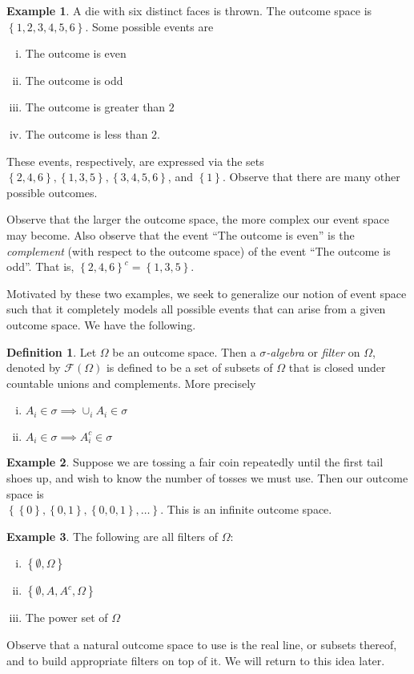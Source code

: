 \documentclass[12pt]{amsbook}
\newcommand{\filter}{\mathcal{F}}
\theoremstyle{plain}
\theoremstyle{definition}
\newtheorem*{definition}{Definition}
\newtheorem*{example}{Example}
\theoremstyle{remark}
\numberwithin{equation}{section}  %
\begin{document}
\begin{example}
	A die with six distinct faces is thrown. The outcome space is
	$ \left\{ 1, 2, 3, 4, 5, 6 \right\} $. Some possible events are
	\begin{enumerate}[(i)]
		\item The outcome is even
		\item The outcome is odd
		\item The outcome is greater than $2$
		\item The outcome is less than $2$.
	\end{enumerate}
	These events, respectively, are expressed via the sets
	$ \left\{ 2, 4, 6 \right\} , \left\{ 1,3,5 \right\} , \left\{ 3, 4, 5, 6
	\right\}$, and $\left\{ 1 \right\}$.
	Observe that there are many other possible outcomes.
\end{example}
Observe that the larger the outcome space, the more complex
our event space may become. Also observe that the event
``The outcome is even'' is the \emph{complement} (with respect to the
outcome space) of
the event ``The outcome is odd''. That is,
${\left\{ 2,4,6 \right\}}^c
= \left\{ 1,3,5 \right\}$.

Motivated by these two examples, we seek to generalize our notion of
event space such that it completely models all possible events
that can arise from a given outcome space. We have the following.
\begin{definition}
	Let $\Omega$ be an outcome space. Then a \emph{$\sigma$-algebra}
	or \emph{filter} on $\Omega$, denoted by $\filter(\Omega)$ is defined to be 
	a
	set of subsets of $\Omega$ that is closed under countable
	unions and complements.
	More precisely
	\begin{enumerate}[(i)]
		\item $ A_i \in  \sigma \implies \cup_i A_i \in \sigma$
		\item $A_i \in \sigma \implies A_i^c \in \sigma$
	\end{enumerate}
\end{definition}
\begin{example}
	Suppose we are tossing a fair coin repeatedly until the first tail shoes up,
	and wish to know the number of tosses we must use. Then our outcome space
	is \\ $ \left\{ \left\{ 0 \right\} , \left\{ 0,1 \right\} , \left\{ 0,0,1
	\right\},\ldots \right\}$. This is an infinite outcome space.
\end{example}
\begin{example} The following are all filters of $\Omega$:
	\begin{enumerate}[(i)]
		\item $\left\{ \emptyset, \Omega \right\}$
		\item $\left\{ \emptyset, A, A^c, \Omega \right\}$
		\item The power set of $\Omega$
	\end{enumerate}
\end{example}
Observe that a natural outcome space to use is the real line, or subsets
thereof, and to build appropriate filters on top of it. We will return
to this idea later.
\end{document}
